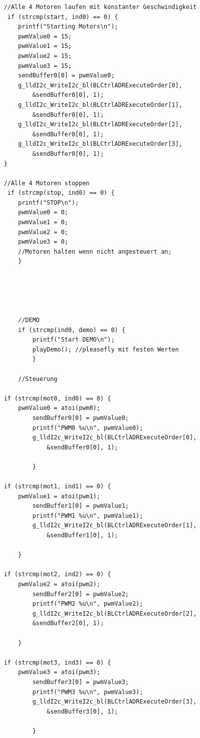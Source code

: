 \documentclass{article}
\begin{document}
\begin{enumerate}
\begin{verbatim}
	//Alle 4 Motoren laufen mit konstanter Geschwindigkeit
     if (strcmp(start, ind0) == 0) {
        printf("Starting Motors\n");
        pwmValue0 = 15;
        pwmValue1 = 15;
        pwmValue2 = 15;
        pwmValue3 = 15;
        sendBuffer0[0] = pwmValue0;
        g_lldI2c_WriteI2c_bl(BLCtrlADRExecuteOrder[0],
        	&sendBuffer0[0], 1);
        g_lldI2c_WriteI2c_bl(BLCtrlADRExecuteOrder[1],
        	&sendBuffer0[0], 1);
		g_lldI2c_WriteI2c_bl(BLCtrlADRExecuteOrder[2],
            &sendBuffer0[0], 1);
        g_lldI2c_WriteI2c_bl(BLCtrlADRExecuteOrder[3],
        	&sendBuffer0[0], 1);
	}

    //Alle 4 Motoren stoppen
     if (strcmp(stop, ind0) == 0) {
        printf("STOP\n");
        pwmValue0 = 0;
        pwmValue1 = 0;
        pwmValue2 = 0;
        pwmValue3 = 0;
        //Motoren halten wenn nicht angesteuert an;
        }





        //DEMO
        if (strcmp(ind0, demo) == 0) {
            printf("Start DEMO\n");
            playDemo();	//pleasefly mit festen Werten
            }

		//Steuerung

	if (strcmp(mot0, ind0) == 0) {
	    pwmValue0 = atoi(pwm0);
            sendBuffer0[0] = pwmValue0;
            printf("PWM0 %u\n", pwmValue0);
            g_lldI2c_WriteI2c_bl(BLCtrlADRExecuteOrder[0],
        	    &sendBuffer0[0], 1);

			}

	if (strcmp(mot1, ind1) == 0) {
	    pwmValue1 = atoi(pwm1);
            sendBuffer1[0] = pwmValue1;
            printf("PWM1 %u\n", pwmValue1);
            g_lldI2c_WriteI2c_bl(BLCtrlADRExecuteOrder[1],
        	    &sendBuffer1[0], 1);

		}

	if (strcmp(mot2, ind2) == 0) {
    	pwmValue2 = atoi(pwm2);
            sendBuffer2[0] = pwmValue2;
            printf("PWM2 %u\n", pwmValue2);
            g_lldI2c_WriteI2c_bl(BLCtrlADRExecuteOrder[2],
		  	&sendBuffer2[0], 1);

		}

	if (strcmp(mot3, ind3) == 0) {
        pwmValue3 = atoi(pwm3);
            sendBuffer3[0] = pwmValue3;
            printf("PWM3 %u\n", pwmValue3);
            g_lldI2c_WriteI2c_bl(BLCtrlADRExecuteOrder[3],
        	    &sendBuffer3[0], 1);

            }

              


\end{verbatim}
\end{enumerate}
\end{document}
